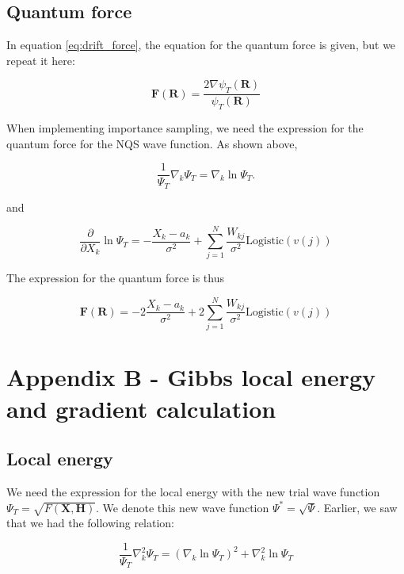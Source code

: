 \documentclass[norsk,a4paper,12pt]{article}
\begin{document}
\subsection{Quantum force}
In equation \ref{eq:drift_force}, the equation for the quantum force is given, but we repeat it here:

\begin{equation*}
\label{eq:drift_force}
\boldsymbol{F}(\boldsymbol{R}) = \frac{2 \nabla \psi_T(\boldsymbol{R})}{\psi_T(\boldsymbol{R})}
\end{equation*}

 When implementing importance sampling, we need the expression for the quantum force for the NQS wave function. As shown above, 
 
\begin{equation}
\frac{1}{\Psi_T}\nabla_k\Psi_T=\nabla_k\ln\Psi_T.
\end{equation}

and

\begin{equation}
\frac{\partial}{\partial X_k}\ln\Psi_T=-\frac{X_k-a_k}{\sigma^2}+\sum_{j=1}^{N}\frac{W_{kj}}{\sigma^2}\text{Logistic}(v(j))
\end{equation}

The expression for the quantum force is thus

\begin{equation}
\boldsymbol{F}(\boldsymbol{R})=-2\frac{X_k-a_k}{\sigma^2}+2\sum_{j=1}^{N}\frac{W_{kj}}{\sigma^2}\text{Logistic}(v(j))
\end{equation}



\section{Appendix B - Gibbs local energy and gradient calculation} \label{sec:appendix_B}

\subsection{Local energy}
We need the expression for the local energy with the new trial wave function $\Psi_T = \sqrt{F(\boldsymbol{X}, \boldsymbol{H})}$. We denote this new wave function $\Psi ^* = \sqrt{\Psi}$. Earlier, we saw that we had the following relation:

\begin{equation}
\frac{1}{\Psi_T}\nabla_k^2\Psi_T = (\nabla_k\ln\Psi_T)^2+\nabla_k^2\ln\Psi_T
\end{equation}
\end{document}
